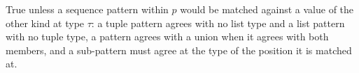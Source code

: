 True unless a sequence pattern within $p$ would be matched against a value of the other kind at type
$\tau$: a tuple pattern agrees with no list type and a list pattern with no tuple type, a pattern agrees
with a union when it agrees with both members, and a sub-pattern must agree at the type of the position it
is matched at.
